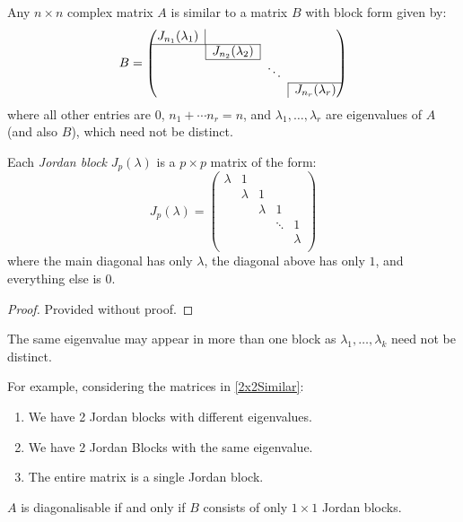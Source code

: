 \documentclass[../main.tex]{subfiles}
\begin{document}
\begin{theorem}
  Any $n \times n$ complex matrix $A$ is similar to a matrix $B$ with block form given by:
  \[
    B = \begin{pmatrix}
    \multicolumn{1}{c|}{J_{n_1}(\lambda_1)} &  &  &  \\ \cline{1-2}
     & \multicolumn{1}{|c|}{J_{n_2}(\lambda_2)} &  &  \\ \cline{2-2}
     &  & \ddots &  \\ \cline{4-4}
     &  &  & \multicolumn{1}{|c}{J_{n_r}(\lambda_r)} \\
    \end{pmatrix}
  \]
  where all other entries are 0, $n_1 + \cdots n_r = n$, and $\lambda_1, \ldots, \lambda_r$ are eigenvalues of $A$ (and also $B$), which need not be distinct.

  Each \textit{Jordan block} $J_p(\lambda)$ is a $p \times p$ matrix of the form:
  \[
    J_p(\lambda) = \begin{pmatrix}
    \lambda & 1 &  &  &  \\
     & \lambda & 1 &  &  \\
     &  & \lambda & 1 &  \\
     &  &  & \ddots &  1\\
     &  &  &  & \lambda \\
    \end{pmatrix}
  \]
  where the main diagonal has only $\lambda$, the diagonal above has only $1$, and everything else is 0.
\end{theorem}
\begin{proof}
  Provided without proof.
\end{proof}
\begin{remark}[Note]
  The same eigenvalue may appear in more than one block as $\lambda_1, \ldots, \lambda_k$ need not be distinct.

  For example, considering the matrices in \cref{2x2Similar}:
  \begin{enumerate}
    \item We have 2 Jordan blocks with different eigenvalues.
    \item We have 2 Jordan Blocks with the same eigenvalue.
    \item The entire matrix is a single Jordan block.
  \end{enumerate}
\end{remark}
\begin{remark}
  $A$ is diagonalisable if and only if $B$ consists of only $1 \times 1$ Jordan blocks.
\end{remark}
\end{document}

